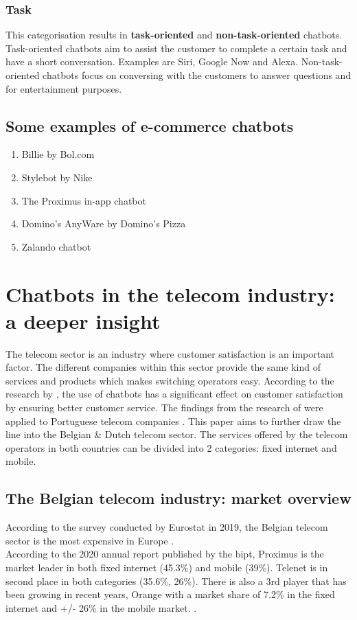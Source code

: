 \subsubsection{Task}
This categorisation results in \textbf{task-oriented} and \textbf{non-task-oriented} chatbots. Task-oriented chatbots aim to assist the customer to complete a certain task and have a short conversation. Examples are Siri, Google Now and Alexa. Non-task-oriented chatbots focus on conversing with the customers to answer questions and for entertainment purposes. \citep{Nuruzzaman2018}

\subsection{Some examples of e-commerce chatbots}
\begin{enumerate}
	\setlength\itemsep{-0.1em}
	\item Billie by Bol.com
	\item Stylebot by Nike
	\item The Proximus in-app chatbot
	\item Domino's AnyWare by Domino's Pizza
	\item Zalando chatbot
\end{enumerate}

\section{Chatbots in the telecom industry: a deeper insight}
The telecom sector is an industry where customer satisfaction is an important factor. The different companies within this sector provide the same kind of services and products which makes switching operators easy. According to the research by \citeauthor{Quintino2019}, the use of chatbots has a significant effect on customer satisfaction by ensuring better customer service. The findings from the research of \citeauthor{Quintino2019} were applied to Portuguese telecom companies \citep{Quintino2019}. This paper aims to further draw the line into the Belgian \& Dutch telecom sector. The services offered by the telecom operators in both countries can be divided into 2 categories: fixed internet and mobile.

\subsection{The Belgian telecom industry: market overview}
According to the survey conducted by Eurostat in 2019, the Belgian telecom sector is the most expensive in Europe \citep{Eurostat2020}.\\
According to the 2020 annual report published by the \acrfull{bipt}, Proximus is the market leader in both fixed internet (45.3\%) and mobile (39\%). Telenet is in second place in both categories (35.6\%, 26\%). There is also a 3rd player that has been growing in recent years, Orange with a market share of 7.2\% in the fixed internet and +/- 26\% in the mobile market. \citep*{BIPT2021,VanLeemputten2021}.


